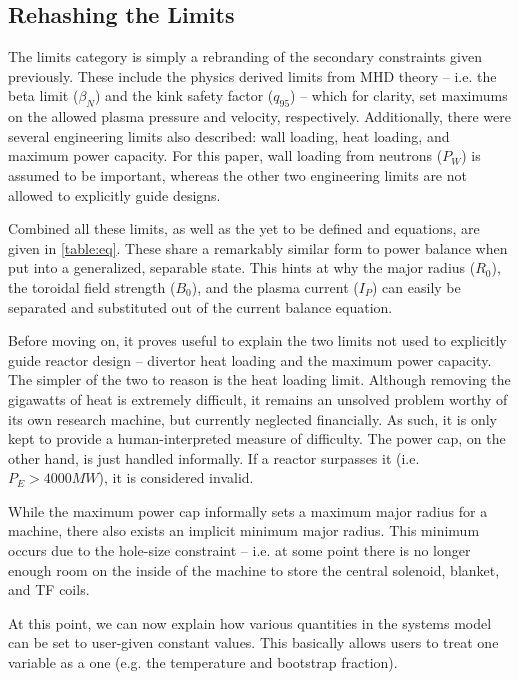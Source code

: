 \subsection{Rehashing the Limits}

The limits category is simply a rebranding of the secondary constraints given previously. These include the physics derived limits from MHD theory -- i.e. the beta limit ($\beta_N$) and the kink safety factor ($q_{95}$) -- which for clarity, set maximums on the allowed plasma pressure and velocity, respectively. Additionally, there were several engineering limits also described: wall loading, heat loading, and maximum power capacity. For this paper, wall loading from neutrons ($P_W$) is assumed to be important, whereas the other two engineering limits are not allowed to explicitly guide designs.

Combined all these limits, as well as the yet to be defined  and  equations, are given in \cref{table:eq}. These share a remarkably similar form to power balance when put into a generalized, separable state. This hints at why the major radius ($R_0$), the toroidal field strength ($B_0$), and the plasma current ($I_P$) can easily be separated and substituted out of the current balance equation.

Before moving on, it proves useful to explain the two limits not used to explicitly guide reactor design -- divertor heat loading and the maximum power capacity. The simpler of the two to reason is the heat loading limit. Although removing the gigawatts of heat is extremely difficult, it remains an unsolved problem worthy of its own research machine, but currently neglected financially. As such, it is only kept to provide a human-interpreted  measure of difficulty. The power cap, on the other hand, is just handled informally. If a reactor surpasses it (i.e. $ P_E > 4000 MW $), it is considered invalid.

While the maximum power cap informally sets a maximum major radius for a machine, there also exists an implicit minimum major radius. This minimum occurs due to the hole-size constraint -- i.e. at some point there is no longer enough room on the inside of the machine to store the central solenoid, blanket, and TF coils.

At this point, we can now explain how various quantities in the systems model can be set to user-given constant values. This basically allows users to treat one  variable as a  one (e.g. the temperature and bootstrap fraction).

